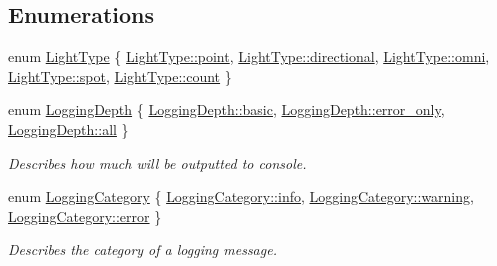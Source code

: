 \subsection*{Enumerations}
\begin{DoxyCompactItemize}
\item 
enum \mbox{\hyperlink{namespaceec_a30e2a743ebdeb02ac68a6cfa50f629c7}{Light\+Type}} \{ \newline
\mbox{\hyperlink{namespaceec_a30e2a743ebdeb02ac68a6cfa50f629c7a78ee54aa8f813885fe2fe20d232518b9}{Light\+Type\+::point}}, 
\mbox{\hyperlink{namespaceec_a30e2a743ebdeb02ac68a6cfa50f629c7aff17f76a314be3abfb17f7c9e849ba34}{Light\+Type\+::directional}}, 
\mbox{\hyperlink{namespaceec_a30e2a743ebdeb02ac68a6cfa50f629c7a3aa53cec161c587e51555bdfa5c56eff}{Light\+Type\+::omni}}, 
\mbox{\hyperlink{namespaceec_a30e2a743ebdeb02ac68a6cfa50f629c7ab2e189abf85e809a51522cdb0e53083a}{Light\+Type\+::spot}}, 
\newline
\mbox{\hyperlink{namespaceec_a30e2a743ebdeb02ac68a6cfa50f629c7ae2942a04780e223b215eb8b663cf5353}{Light\+Type\+::count}}
 \}
\item 
enum \mbox{\hyperlink{namespaceec_a4b0151aefd16631c24dd6464fd331e4b}{Logging\+Depth}} \{ \mbox{\hyperlink{namespaceec_a4b0151aefd16631c24dd6464fd331e4baf17aaabc20bfe045075927934fed52d2}{Logging\+Depth\+::basic}}, 
\mbox{\hyperlink{namespaceec_a4b0151aefd16631c24dd6464fd331e4bab5e7a5d958347ed25ea6dc293d107e15}{Logging\+Depth\+::error\+\_\+only}}, 
\mbox{\hyperlink{namespaceec_a4b0151aefd16631c24dd6464fd331e4baa181a603769c1f98ad927e7367c7aa51}{Logging\+Depth\+::all}}
 \}
\begin{DoxyCompactList}\small\item\em Describes how much will be outputted to console. \end{DoxyCompactList}\item 
enum \mbox{\hyperlink{namespaceec_a67e511e8b22e1051ea392cb2f68315d8}{Logging\+Category}} \{ \mbox{\hyperlink{namespaceec_a67e511e8b22e1051ea392cb2f68315d8acaf9b6b99962bf5c2264824231d7a40c}{Logging\+Category\+::info}}, 
\mbox{\hyperlink{namespaceec_a67e511e8b22e1051ea392cb2f68315d8a7b83d3f08fa392b79e3f553b585971cd}{Logging\+Category\+::warning}}, 
\mbox{\hyperlink{namespaceec_a67e511e8b22e1051ea392cb2f68315d8acb5e100e5a9a3e7f6d1fd97512215282}{Logging\+Category\+::error}}
 \}
\begin{DoxyCompactList}\small\item\em Describes the category of a logging message. \end{DoxyCompactList}\end{DoxyCompactItemize}
